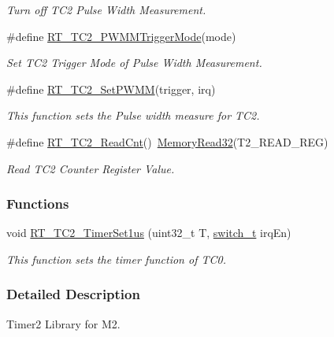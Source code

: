 \begin{DoxyCompactItemize}
\begin{DoxyCompactList}\small\item\em Turn off T\+C2 Pulse Width Measurement. \end{DoxyCompactList}\item 
\#define \mbox{\hyperlink{a00047_a80f5ade258504a1243ccb058dd860475}{R\+T\+\_\+\+T\+C2\+\_\+\+P\+W\+M\+M\+Trigger\+Mode}}(mode)
\begin{DoxyCompactList}\small\item\em Set T\+C2 Trigger Mode of Pulse Width Measurement. \end{DoxyCompactList}\item 
\#define \mbox{\hyperlink{a00047_ad3b483689d5dd170a343222a71f43c9f}{R\+T\+\_\+\+T\+C2\+\_\+\+Set\+P\+W\+MM}}(trigger,  irq)
\begin{DoxyCompactList}\small\item\em This function sets the Pulse width measure for T\+C2. \end{DoxyCompactList}\item 
\#define \mbox{\hyperlink{a00047_a6591a513f367f6e7be0a90cb72aa3d49}{R\+T\+\_\+\+T\+C2\+\_\+\+Read\+Cnt}}()~\mbox{\hyperlink{a00020_a706b02571285f92589fbb0b964d7d0bb}{Memory\+Read32}}(T2\+\_\+\+R\+E\+A\+D\+\_\+\+R\+EG)
\begin{DoxyCompactList}\small\item\em Read T\+C2 Counter Register Value. \end{DoxyCompactList}\end{DoxyCompactItemize}
\subsubsection*{Functions}
\begin{DoxyCompactItemize}
\item 
void \mbox{\hyperlink{a00047_a295c11e348fa97400f36ddf1ece55368}{R\+T\+\_\+\+T\+C2\+\_\+\+Timer\+Set1us}} (uint32\+\_\+t T, \mbox{\hyperlink{a00020_ab43e533f3793920486fb81c580f71564}{switch\+\_\+t}} irq\+En)
\begin{DoxyCompactList}\small\item\em This function sets the timer function of T\+C0. \end{DoxyCompactList}\end{DoxyCompactItemize}


\subsubsection{Detailed Description}
Timer2 Library for M2. 

